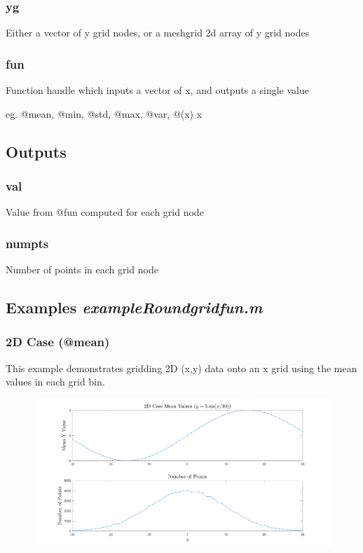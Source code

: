 \documentclass{article}
\begin{document}
\subsubsection{yg}
Either a vector of y grid nodes, or a meshgrid 2d array of y grid nodes

\subsubsection{fun}
Function handle which inputs a vector of x, and outputs a single value

eg. @mean, @min, @std, @max, @var, @(x) {x}

\subsection{Outputs}
\subsubsection{val}
Value from @fun computed for each grid node

\subsubsection{numpts}
Number of points in each grid node

\clearpage
\subsection{Examples \textit{exampleRoundgridfun.m}}
\subsubsection*{2D Case (@mean)}
This example demonstrates gridding 2D (x,y) data onto an x grid using the mean values in each grid bin.


\begin{figure}[H]
	\centering
	\includegraphics[width = \linewidth]{2d}
\end{figure}
\end{document}
